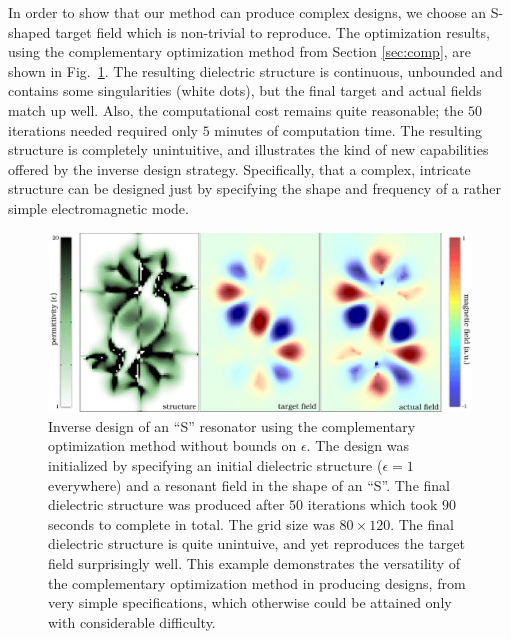 In order to show that our method can produce complex designs, we choose an S-shaped target field which is non-trivial to reproduce. The optimization results, using the complementary optimization method from Section \ref{sec:comp}, are shown in Fig.~\ref{S pic}. The resulting dielectric structure is continuous, unbounded and contains some singularities (white dots), but the final target and actual fields match up well. Also, the computational cost remains quite reasonable; the $50$ iterations needed required only $5$ minutes of computation time. The resulting structure is completely unintuitive, and illustrates the kind of new capabilities offered by the inverse design strategy. Specifically, that a complex, intricate structure can be designed just by specifying the shape and frequency of a rather simple electromagnetic mode.
\begin{figure}\centering
\includegraphics[width=\textwidth]{p1/S}
\caption{Inverse design of an ``S'' resonator using the complementary optimization method without bounds on $\epsilon$. The design was initialized by specifying an initial dielectric structure ($\epsilon=1$ everywhere) and a resonant field in the shape of an ``S''. The final dielectric structure was produced after $50$ iterations which took $90$ seconds to complete in total. The grid size was $80\times 120$. The final dielectric structure is quite unintuive, and yet reproduces the target field surprisingly well. This example demonstrates the versatility of the complementary optimization method in producing designs, from very simple specifications, which otherwise could be attained only with considerable difficulty.}
\label{S pic}
\end{figure}


